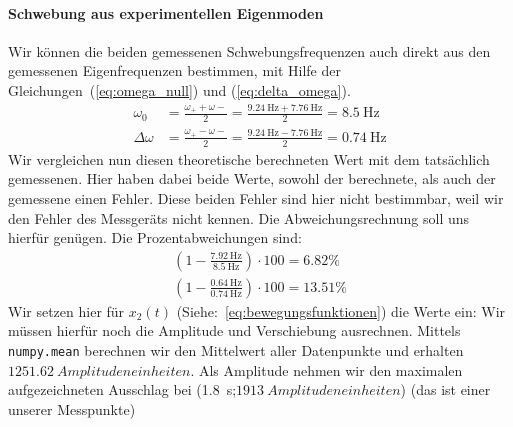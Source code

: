 \documentclass{article}
\begin{document}
              \paragraph{Schwebung aus experimentellen Eigenmoden}
                  Wir können die beiden gemessenen Schwebungsfrequenzen auch direkt aus den gemessenen Eigenfrequenzen bestimmen,
                  mit Hilfe der Gleichungen~(\ref{eq:omega_null}) und (\ref{eq:delta_omega}).
                  \begin{equation}
                      \begin{aligned}
                          \omega_0      & = \frac{ \omega_{+} + \omega{-} }{ 2 } = \frac{ \SI{9.24}{\hertz} + \SI{7.76}{\hertz} }{2} = \SI{8.5}{\hertz}  \\ %
                          \Delta \omega & = \frac{ \omega_{+} - \omega{-} }{ 2 } = \frac{ \SI{9.24}{\hertz} - \SI{7.76}{\hertz} }{2} = \SI{0.74}{\hertz} %
                      \end{aligned}
                  \end{equation}
                  Wir vergleichen nun diesen theoretische berechneten Wert mit dem tatsächlich gemessenen.
                  Hier haben dabei beide Werte, sowohl der berechnete, als auch der gemessene einen Fehler.
                  Diese beiden Fehler sind hier nicht bestimmbar, weil wir den Fehler des Messgeräts nicht kennen.
                  Die Abweichungsrechnung soll uns hierfür genügen.
                  Die Prozentabweichungen sind:
                  \begin{equation}
                      \begin{aligned}
                          \left( 1 - \frac{\SI{7.92}{\hertz}}{\SI{8.5}{\hertz}} \right) \cdot 100 = 6.82 \% \\ %
                          \left( 1 - \frac{\SI{0.64}{\hertz}}{\SI{0.74}{\hertz}} \right) \cdot 100 = 13.51 \% %
                      \end{aligned}
                  \end{equation}
                  Wir setzen hier für \(x_2(t)\) (Siehe:~\ref{eq:bewegungsfunktionen}) die Werte ein:
                  Wir müssen hierfür noch die Amplitude und Verschiebung ausrechnen.
                  Mittels \texttt{numpy.mean} berechnen wir den Mittelwert aller Datenpunkte und erhalten \(\SI{1251.62}{Amplitudeneinheiten}\).
                  Als Amplitude nehmen wir den maximalen aufgezeichneten Ausschlag bei (\SI{1.8}{\second};\(\SI{1913}{Amplitudeneinheiten}\)) (das ist einer unserer Messpunkte)
\end{document}
